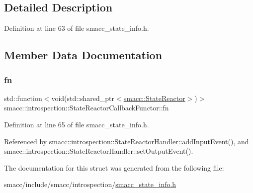 \subsection{Detailed Description}


Definition at line 63 of file smacc\+\_\+state\+\_\+info.\+h.



\subsection{Member Data Documentation}
\mbox{\label{structsmacc_1_1introspection_1_1StateReactorCallbackFunctor_a43abfabf0bcfc2edbc06c9809b277f31}} 
\subsubsection{\texorpdfstring{fn}{fn}}
{\footnotesize\ttfamily std\+::function$<$void(std\+::shared\+\_\+ptr$<$\hyperlink{classsmacc_1_1StateReactor}{smacc\+::\+State\+Reactor}$>$)$>$ smacc\+::introspection\+::\+State\+Reactor\+Callback\+Functor\+::fn}



Definition at line 65 of file smacc\+\_\+state\+\_\+info.\+h.



Referenced by smacc\+::introspection\+::\+State\+Reactor\+Handler\+::add\+Input\+Event(), and smacc\+::introspection\+::\+State\+Reactor\+Handler\+::set\+Output\+Event().



The documentation for this struct was generated from the following file\+:\begin{DoxyCompactItemize}
\item 
smacc/include/smacc/introspection/\hyperlink{smacc__state__info_8h}{smacc\+\_\+state\+\_\+info.\+h}\end{DoxyCompactItemize}
